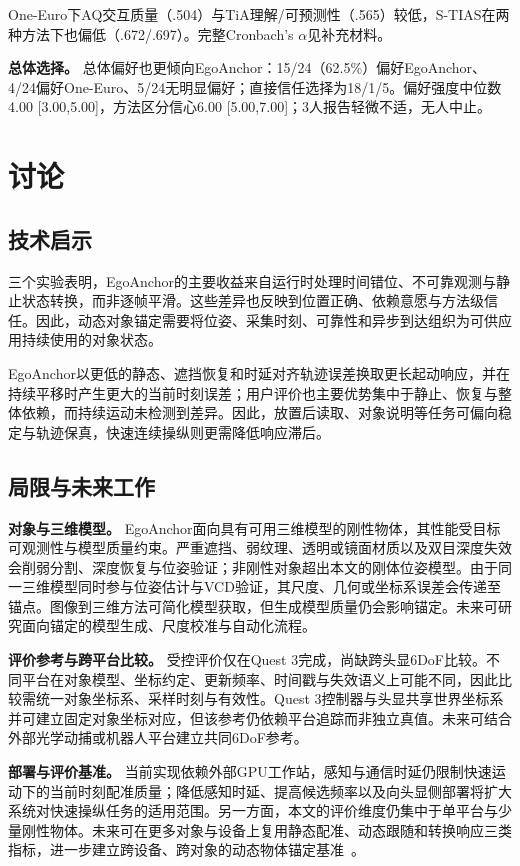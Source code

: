 \documentclass[review]{vgtc}
\begin{document}
One-Euro下AQ交互质量（.504）与TiA理解/可预测性（.565）较低，S-TIAS在两种方法下也偏低（.672/.697）。完整Cronbach's $\alpha$见补充材料。

\textbf{总体选择。}
总体偏好也更倾向EgoAnchor：15/24（62.5\%）偏好EgoAnchor、4/24偏好One-Euro、5/24无明显偏好；直接信任选择为18/1/5。偏好强度中位数4.00 [3.00,5.00]，方法区分信心6.00 [5.00,7.00]；3人报告轻微不适，无人中止。

\section{讨论}\label{sec:discussion}

\subsection{技术启示}

三个实验表明，EgoAnchor的主要收益来自运行时处理时间错位、不可靠观测与静止状态转换，而非逐帧平滑。这些差异也反映到位置正确、依赖意愿与方法级信任。因此，动态对象锚定需要将位姿、采集时刻、可靠性和异步到达组织为可供应用持续使用的对象状态。

EgoAnchor以更低的静态、遮挡恢复和时延对齐轨迹误差换取更长起动响应，并在持续平移时产生更大的当前时刻误差；用户评价也主要优势集中于静止、恢复与整体依赖，而持续运动未检测到差异。因此，放置后读取、对象说明等任务可偏向稳定与轨迹保真，快速连续操纵则更需降低响应滞后。

\subsection{局限与未来工作}

\textbf{对象与三维模型。}
EgoAnchor面向具有可用三维模型的刚性物体，其性能受目标可观测性与模型质量约束。严重遮挡、弱纹理、透明或镜面材质以及双目深度失效会削弱分割、深度恢复与位姿验证；非刚性对象超出本文的刚体位姿模型。由于同一三维模型同时参与位姿估计与VCD验证，其尺度、几何或坐标系误差会传递至锚点。图像到三维方法可简化模型获取，但生成模型质量仍会影响锚定。未来可研究面向锚定的模型生成、尺度校准与自动化流程。

\textbf{评价参考与跨平台比较。}
受控评价仅在Quest 3完成，尚缺跨头显6DoF比较。不同平台在对象模型、坐标约定、更新频率、时间戳与失效语义上可能不同，因此比较需统一对象坐标系、采样时刻与有效性。Quest 3控制器与头显共享世界坐标系并可建立固定对象坐标对应，但该参考仍依赖平台追踪而非独立真值。未来可结合外部光学动捕或机器人平台建立共同6DoF参考。

\textbf{部署与评价基准。}
当前实现依赖外部GPU工作站，感知与通信时延仍限制快速运动下的当前时刻配准质量；降低感知时延、提高候选频率以及向头显侧部署将扩大系统对快速操纵任务的适用范围。另一方面，本文的评价维度仍集中于单平台与少量刚性物体。未来可在更多对象与设备上复用静态配准、动态跟随和转换响应三类指标，进一步建立跨设备、跨对象的动态物体锚定基准~\cite{cheng2024tracking,hu2024applemeta,hu2025xrrealitycheck}。
\end{document}
